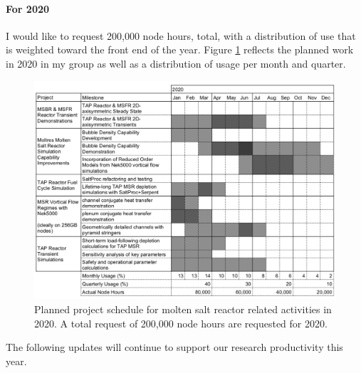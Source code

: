 \documentclass[letterpaper]{article}
\begin{document}
\paragraph{For 2020} I would like to request 200,000 node hours, total, with a 
distribution of use that is weighted toward the front end of the year. 
Figure \ref{fig:bw-usage-2020} reflects the planned work in 2020 in my group as 
well as a distribution of usage per month and quarter.

\begin{figure}[htbp!]
\begin{center}
        \includegraphics[width=\textwidth]{bw-usage-2020.png}
\end{center}
\caption{Planned project schedule for molten salt reactor related activities in 
2020. A total request of 200,000 node hours are requested for 2020.}
\label{fig:bw-usage-2020}
\end{figure}

The following updates will continue to support our research 
productivity this year. 
\end{document}

